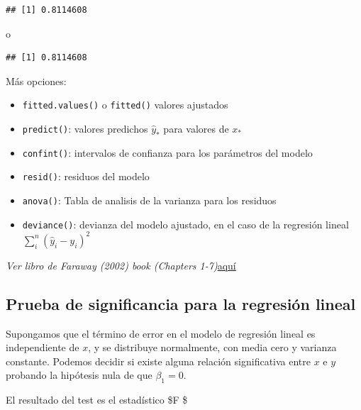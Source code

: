 \documentclass[]{article}
\newenvironment{Shaded}{\begin{snugshade}}{\end{snugshade}}
\newcommand{\KeywordTok}[1]{\textcolor[rgb]{0.13,0.29,0.53}{\textbf{{#1}}}}
\newcommand{\DecValTok}[1]{\textcolor[rgb]{0.00,0.00,0.81}{{#1}}}
\newcommand{\NormalTok}[1]{{#1}}
\numberwithin{equation}{section}
\begin{document}
\begin{verbatim}
## [1] 0.8114608
\end{verbatim}

o

\begin{Shaded}
\end{Shaded}

\begin{verbatim}
## [1] 0.8114608
\end{verbatim}

Más opciones:

\begin{itemize}
\item
  \texttt{fitted.values()} o \texttt{fitted()} valores ajustados
\item
  \texttt{predict()}: valores predichos \(\hat{y}_*\) para valores de
  \(x_*\)
\item
  \texttt{confint()}: intervalos de confianza para los parámetros del
  modelo
\item
  \texttt{resid()}: residuos del modelo
\item
  \texttt{anova()}: Tabla de analisis de la varianza para los residuos
\item
  \texttt{deviance()}: devianza del modelo ajustado, en el caso de la
  regresión lineal \(\sum_i^{n}(\hat{y}_i - y_i)^2\)
\end{itemize}

\emph{Ver libro de Faraway (2002) book (Chapters
1-7)}\href{http://www.maths.bath.ac.uk/~jjf23/book/}{aquí}

\subsection{Prueba de significancia para la regresión
lineal}\label{prueba-de-significancia-para-la-regresion-lineal}

Supongamos que el término de error en el modelo de regresión lineal es
independiente de \(x\), y se distribuye normalmente, con media cero y
varianza constante. Podemos decidir si existe alguna relación
significativa entre \(x\) e \(y\) probando la hipótesis nula de que
\(\beta_1 = 0\).

El resultado del test es el estadístico \$F \$
\end{document}
